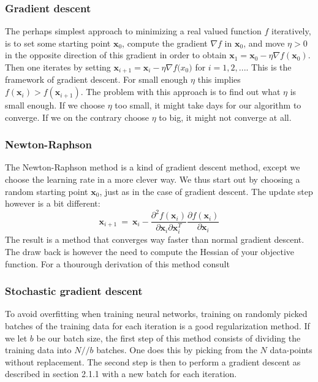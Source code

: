 \documentclass[parskip=half]{scrartcl}
\theoremstyle{definition}
\theoremstyle{remark}
\begin{document}
\subsubsection{Gradient descent}
The perhaps simplest approach to minimizing a real valued function
$f$ iteratively, is to set some starting point $\bm{x}_0$, compute the 
gradient
$\nabla f$ in $\bm{x}_0$, and move $\eta > 0$ in the opposite direction of 
this gradient in order to obtain 
$\bm{x}_1 = \bm{x}_0 - \eta \nabla f(\bm{x}_0)$. Then
one iterates by setting 
$\bm{x}_{i+1} = \bm{x}_i - \eta \nabla f\bm{(}x_0)$ for $i=1,2,...$. 
This is the framework of gradient descent.
For small enough $\eta$ this implies $f(\bm{x}_i) > f(\bm{x}_{i+1})$. 
The problem with this approach is to find out what 
$\eta$ is small enough. If we choose
$\eta$ too small, it might take days for our algorithm to converge. If 
we on the contrary choose $\eta$ to big, it might not converge at all.

\subsubsection{Newton-Raphson}
The Newton-Raphson method is a kind of gradient descent method, 
except we choose the learning rate in a more clever way. We thus 
start out by choosing a random starting point $\bm{x}_0$, just as in the 
case of gradient descent. The update step however is a bit different:
\begin{equation}
    \bm{x}_{i+1} \ = \ \bm{x}_{i} - 
    \frac{\partial^2 f(\bm{x}_i)}{\partial \bm{x}_i \partial \bm{x}_i^T} 
    \frac{\partial f(\bm{x}_i)}{\partial \bm{x}_i}
\end{equation}
The result is a method that converges way faster than normal gradient 
descent. The draw back is however the need to compute the Hessian of 
your objective function. For a thourough derivation of this method 
consult \cite{gradient}

\subsubsection{Stochastic gradient descent}
To avoid overfitting when training neural networks, training on 
randomly picked batches of the training data for each iteration is a good
regularization method. If we let $b$ be our batch size, the first step of
this method consists of dividing the training data into $N//b$ batches. 
One does this by picking from the $N$ data-points without replacement. 
The second step is then to perform a gradient descent as described in 
section 2.1.1 with a new batch for each iteration.
\end{document}
